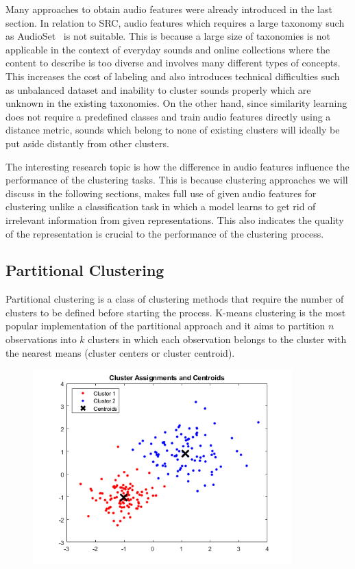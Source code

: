 Many approaches to obtain audio features were already introduced in the last section. In relation to SRC, audio features which requires a large taxonomy such as AudioSet~\cite{AudioSet} is not suitable. This is because a large size of taxonomies is not applicable in the context of everyday sounds and online collections where the content to describe is too diverse and involves many different types of concepts. This increases the cost of labeling and also introduces technical difficulties such as unbalanced dataset and inability to cluster sounds properly which are unknown in the existing taxonomies. On the other hand, since similarity learning does not require a predefined classes and train audio features directly using a distance metric, sounds which belong to none of existing clusters will ideally be put aside distantly from other clusters.

 The interesting research topic is how the difference in audio features influence the performance of the clustering tasks. This is because clustering approaches we will discuss in the following sections, makes full use of given audio features for clustering unlike a classification task in which a model learns to get rid of irrelevant information from given representations. This also indicates the quality of the representation is crucial to the performance of the clustering process. %
 
 
\subsection{Partitional Clustering}
Partitional clustering is a class of clustering methods that require the number of clusters to be defined before starting the process. K-means clustering is the most popular implementation of the partitional approach and it aims to partition $n$ observations into $k$ clusters in which each observation belongs to the cluster with the nearest means (cluster centers or cluster centroid).

\begin{figure}[htb]
	\centering
	\includegraphics[width=10cm]{Figures/kmeans_diagram.png}
	\caption{}
	\label{kmeans-diagram}
\end{figure}

